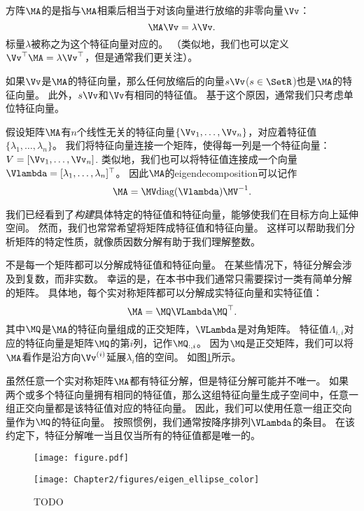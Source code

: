 方阵$\MA$的是指与$\MA$相乘后相当于对该向量进行放缩的非零向量$\Vv$：
\begin{equation}
    \MA\Vv=\lambda \Vv.
\end{equation}
标量$\lambda$被称之为这个特征向量对应的。
（类似地，我们也可以定义$\Vv^\top\MA=\lambda \Vv^\top$，但是通常我们更关注）。


如果$\Vv$是$\MA$的特征向量，那么任何放缩后的向量$s\Vv$($s\in \SetR$)也是$\MA$的特征向量。
此外，$s\Vv$和$\Vv$有相同的特征值。
基于这个原因，通常我们只考虑单位特征向量。


假设矩阵$\MA$有$n$个线性无关的特征向量$\{\Vv_1, \dots, \Vv_n\}$，对应着特征值$\{\lambda_1, \dots , \lambda_n \}$。
我们将特征向量连接一个矩阵，使得每一列是一个特征向量：$V=[\Vv_1, \dots , \Vv_n]$.
类似地，我们也可以将特征值连接成一个向量$\Vlambda = [\lambda_1, \dots , \lambda_n]^\top$。
因此$\MA$的\gls{eigendecomposition}可以记作
\begin{equation}
    \MA = \MV \text{diag}(\mathbf{\Vlambda}) \MV^{-1}.
\end{equation}


我们已经看到了\emph{构建}具体特定的特征值和特征向量，能够使我们在目标方向上延伸空间。
然而，我们也常常希望将矩阵成特征值和特征向量。
这样可以帮助我们分析矩阵的特定性质，就像质因数分解有助于我们理解整数。


不是每一个矩阵都可以分解成特征值和特征向量。
在某些情况下，特征分解会涉及到复数，而非实数。
幸运的是，在本书中我们通常只需要探讨一类有简单分解的矩阵。
具体地，每个实对称矩阵都可以分解成实特征向量和实特征值：
\begin{equation}
    \MA = \MQ \VLambda \MQ^\top.
\end{equation}
其中$\MQ$是$\MA$的特征向量组成的正交矩阵，$\VLambda$是对角矩阵。
特征值$\Lambda_{i,i}$对应的特征向量是矩阵$\MQ$的第$i$列，记作$\MQ_{:,i}$。
因为$\MQ$是正交矩阵，我们可以将$\MA$看作是沿方向$\Vv^{(i)}$延展$\lambda_i$倍的空间。
如图\ref{fig:chap2_eigen_ellipse}所示。


虽然任意一个实对称矩阵$\MA$都有特征分解，但是特征分解可能并不唯一。
如果两个或多个特征向量拥有相同的特征值，那么这组特征向量生成子空间中，任意一组正交向量都是该特征值对应的特征向量。
因此，我们可以使用任意一组正交向量作为$\MQ$的特征向量。
按照惯例，我们通常按降序排列$\VLambda$的条目。
在该约定下，特征分解唯一当且仅当所有的特征值都是唯一的。

\begin{figure}[!htb]
\ifOpenSource
\centerline{\texttt{[image: figure.pdf]}}
\else
\centerline{\texttt{[image: Chapter2/figures/eigen\_ellipse\_color]}}
\fi
\caption{TODO}
\label{fig:chap2_eigen_ellipse}
\end{figure}

